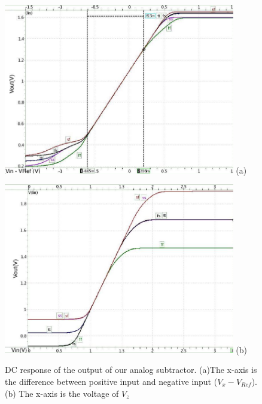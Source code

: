 {\begin{figure}[!htbp]
    \centering
    \begin{minipage}[t]{1\textwidth}
        \includegraphics[width=0.9\textwidth] {images/chapter5/postSim/subtractor_5_xx.jpg}
        \raggedleft
        (a)
    \end{minipage}
    \vfill
    \begin{minipage}[t]{1\textwidth}
        \includegraphics[width=0.9\textwidth] {images/chapter5/postSim/subtractor_5_zz.jpg}
        \raggedleft
        (b)
    \end{minipage}
    \caption{DC response of the output of our analog subtractor. (a)The x-axis is the difference between positive input and negative input ($V_x - V_{Ref}$). (b) The x-axis is the voltage of $V_z$ }
    \label{fig:sim:subtractor}
\end{figure}


}
